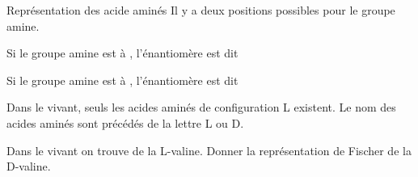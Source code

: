 \begin{doc}{Représentation des acide aminés}
  Il y a deux positions possibles pour le groupe amine.
  \begin{importants}
    \begin{listePoints}
      \item Si le groupe amine est à , l'énantiomère est dit 
      \item Si le groupe amine est à , l'énantiomère est dit 
    \end{listePoints}
  \end{importants}

  Dans le vivant, seuls les acides aminés de configuration L existent.
  Le nom des acides aminés sont précédés de la lettre L ou D.
\end{doc}

\schematisation
Dans le vivant on trouve de la L-valine.
Donner la représentation de Fischer de la D-valine.
\smallskip

\begin{minipage}[T]{0.48\linewidth}
  \centering
\end{minipage}
\smallskip


